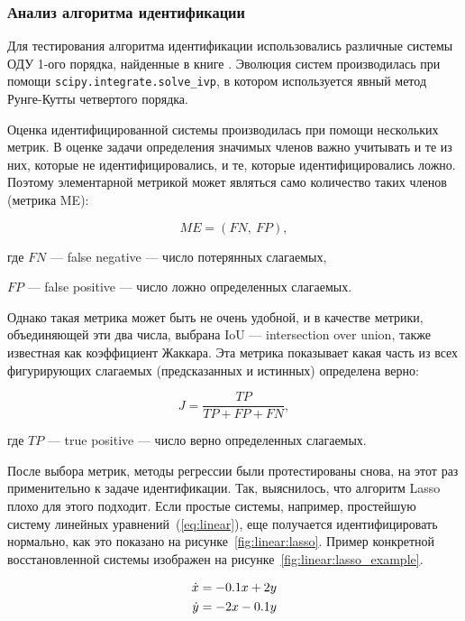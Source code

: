 \subsubsection{Анализ алгоритма идентификации}

Для тестирования алгоритма идентификации использовались различные системы ОДУ 1-ого порядка, найденные в книге \cite{synergetics}. Эволюция систем производилась при помощи \texttt{scipy.integrate.solve\_ivp}, в котором используется явный метод Рунге-Кутты четвертого порядка.

Оценка идентифицированной системы производилась при помощи нескольких метрик. В оценке задачи определения значимых членов важно учитывать и те из них, которые не идентифицировались, и те, которые идентифицировались ложно. Поэтому элементарной метрикой может являться само количество таких членов (метрика ME):

\begin{equation}
ME = (FN,\ FP),
\end{equation}

где $FN$ --- false negative --- число потерянных слагаемых,\par
$FP$ --- false positive --- число ложно определенных слагаемых.

Однако такая метрика может быть не очень удобной, и в качестве метрики, объединяющей эти два числа, выбрана IoU --- intersection over union, также известная как коэффициент Жаккара. Эта метрика показывает какая часть из всех фигурирующих слагаемых (предсказанных и истинных) определена верно:

\begin{equation}
J = \frac{TP}{TP + FP + FN},
\end{equation}

где $TP$ --- true positive --- число верно определенных слагаемых.

После выбора метрик, методы регрессии были протестированы снова, на этот раз применительно к задаче идентификации. Так, выяснилось, что алгоритм Lasso плохо для этого подходит. Если простые системы, например, простейшую систему линейных уравнений~(\ref{eq:linear}), еще получается идентифицировать нормально, как это показано на рисунке~\ref{fig:linear:lasso}. Пример конкретной восстановленной системы изображен на рисунке~\ref{fig:linear:lasso_example}.

\begin{equation}
\normalspacing
\begin{aligned}
\dot{x} &= -0.1 x + 2 y \\
\dot{y} &= -2 x - 0.1 y
\end{aligned}
\label{eq:linear}
\end{equation}

